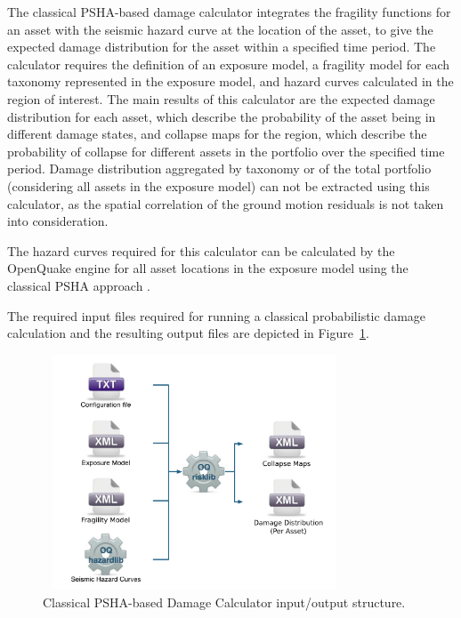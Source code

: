 The classical PSHA-based damage calculator integrates the fragility functions
for an asset with the seismic hazard curve at the location of the asset, to
give the expected damage distribution for the asset within a specified time
period. The calculator requires the definition of an exposure model, a
fragility model for each taxonomy represented in the exposure model, and
hazard curves calculated in the region of interest. The main results of this
calculator are the expected damage distribution for each asset, which describe
the probability of the asset being in different damage states, and collapse
maps for the region, which describe the probability of collapse for different
assets in the portfolio over the specified time period. Damage distribution
aggregated by taxonomy or of the total portfolio (considering all assets in
the exposure model) can not be extracted using this calculator, as the spatial
correlation of the ground motion residuals is not taken into consideration.

The hazard curves required for this calculator can be calculated by the
OpenQuake engine for all asset locations in the exposure model using the
classical PSHA approach \citep{cornell1968, mcguire1976}.

The required input files required for running a classical probabilistic damage
calculation and the resulting output files are depicted in Figure~\ref{fig:io-structure-classical-damage}.

\begin{figure}[ht]
\centering
\includegraphics[width=9cm,height=7cm]{figures/risk/io-structure-classical-damage.pdf}
\caption{Classical PSHA-based Damage Calculator input/output structure.}
\label{fig:io-structure-classical-damage}
\end{figure}